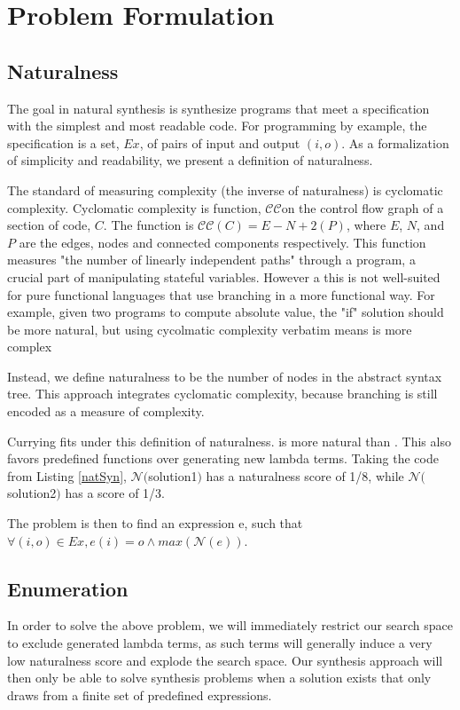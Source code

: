 \section{Problem Formulation}
\label{problem}

\subsection{Naturalness}

The goal in natural synthesis is synthesize programs that meet a specification with the simplest and most readable code.
For programming by example, the specification is a set, $Ex$, of pairs of input and output $(i,o)$.
As a formalization of simplicity and readability, we present a definition of naturalness.

The standard of measuring complexity (the inverse of naturalness) is cyclomatic complexity\cite{cyclo}.
Cyclomatic complexity is function, $\mathcal{CC}$on the control flow graph of a section of code, $C$.
The function is $\mathcal{CC}(C) = E − N + 2(P)$, where $E$, $N$, and $P$ are the edges, nodes and connected components respectively.
This function measures "the number of linearly independent paths" through a program, a crucial part of manipulating stateful variables.
However a this is not well-suited for pure functional languages that use branching in a more functional way.
For example, given two programs to compute absolute value, the "if" solution should be more natural, but using cycolmatic complexity verbatim means
 is more complex

Instead, we define naturalness to be the number of nodes in the abstract syntax tree.
This approach integrates cyclomatic complexity, because branching is still encoded as a measure of complexity.

Currying fits under this definition of naturalness.
 is more natural than .
This also favors predefined functions over generating new lambda terms.
Taking the code from Listing \ref{natSyn}, $\mathcal{N}($solution1$)$ has a naturalness score of 1/8, while $\mathcal{N}($solution2$)$ has a score of 1/3.

The problem is then to find an expression e, such that $\forall (i,o) \in Ex, e (i) = o \land max(\mathcal{N}(e))$.


\subsection{Enumeration}
In order to solve the above problem, we will immediately restrict our search space to exclude generated lambda terms, as such terms will generally induce a very low naturalness score and explode the search space.
Our synthesis approach will then only be able to solve synthesis problems when a solution exists that only draws from a finite set of predefined expressions.

